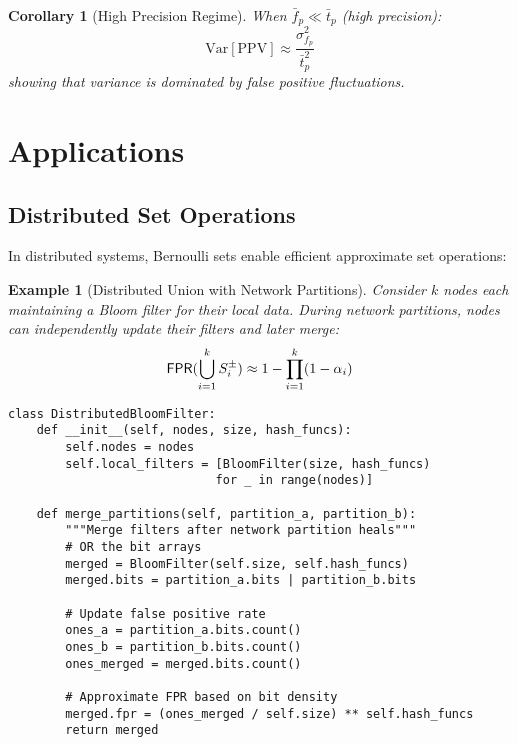 \documentclass[11pt,final,hidelinks]{article}
\newtheorem{corollary}[theorem]{Corollary}
\newtheorem{example}[theorem]{Example}
\newcommand{\setpm}[1]{#1^{\pm}} %
\newcommand{\ASet}[1]{\setpm{#1}}  %
\begin{document}
\begin{corollary}[High Precision Regime]
When $\bar{f}_p \ll \bar{t}_p$ (high precision):
\begin{equation}
\text{Var}[\text{PPV}] \approx \frac{\sigma_{f_p}^2}{\bar{t}_p^2}
\end{equation}
showing that variance is dominated by false positive fluctuations.
\end{corollary}

\section{Applications}

\subsection{Distributed Set Operations}

In distributed systems, Bernoulli sets enable efficient approximate set operations:

\begin{example}[Distributed Union with Network Partitions]
Consider $k$ nodes each maintaining a Bloom filter for their local data. During network partitions, nodes can independently update their filters and later merge:
\begin{equation}
\FPR(\bigcup_{i=1}^k \ASet{S}_i) \approx 1 - \prod_{i=1}^k (1 - \fprate_i)
\end{equation}

\begin{verbatim}
class DistributedBloomFilter:
    def __init__(self, nodes, size, hash_funcs):
        self.nodes = nodes
        self.local_filters = [BloomFilter(size, hash_funcs) 
                             for _ in range(nodes)]
    
    def merge_partitions(self, partition_a, partition_b):
        """Merge filters after network partition heals"""
        # OR the bit arrays
        merged = BloomFilter(self.size, self.hash_funcs)
        merged.bits = partition_a.bits | partition_b.bits
        
        # Update false positive rate
        ones_a = partition_a.bits.count()
        ones_b = partition_b.bits.count()
        ones_merged = merged.bits.count()
        
        # Approximate FPR based on bit density
        merged.fpr = (ones_merged / self.size) ** self.hash_funcs
        return merged
\end{verbatim}
\end{example}
\end{document}
